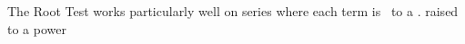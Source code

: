{The Root Test works particularly well on series where each term is  \underlinespace\ to a \underlinespace.
}
{raised to a power
}